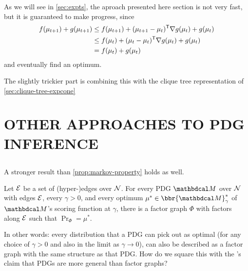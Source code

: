\documentclass[twoside]{article}
\begin{document}
As we will see in \cref{sec:expts}, the aproach presented here section is 
not very fast, but it is guaranteed to make progress, since
\begin{align*}
    f(\mu_{t+1}) + g(\mu_{t+1}) &\le  f(\mu_{t+1}) + (\mu_{t+1}-\mu_t)^{\sf T} \nabla g(\mu_t) + g(\mu_t)
        \\
    &\le  f(\mu_t) + (\mu_t - \mu_{t})^{\sf T}\nabla g(\mu_t)  + g(\mu_t)
        \\
    &= f(\mu_t) + g(\mu_t)
\end{align*}
and eventually find an optimum. 

The slightly trickier part is combining this with the clique tree representation of \cref{sec:clique-tree-expcone}
        
\section{OTHER APPROACHES TO PDG INFERENCE} \label{sec:other-inference}

\subsection{}
A stronger result than \cref{prop:markov-property} holds as well.
\begin{prop}\label{prop:same-set-dists}
    Let $\mathcal E$ be a set of (hyper-)edges over $\mathcal N$. 
    For every PDG $\dg M$ over $\mathcal N$ with edges $\mathcal E$, every $\gamma > 0$, and every optimum $\mu^* \in \bbr{\dg M}_\gamma^*$ of $\dg M$'s scoring function at $\gamma$, 
    there is a factor graph $\Phi$ with factors along $\mathcal E$ such that $\Pr_\Phi = \mu^*$. 
\end{prop}

In other words: every distribution that a PDG can pick out as optimal (for any choice of $\gamma > 0$ and also in the limit as $\gamma \to 0$), can also be described as a factor graph with the same structure as that PDG.
How do we square this with the \citeauthor{pdg-aaai}'s claim that PDGs are more general than factor graphs?

\end{document}
